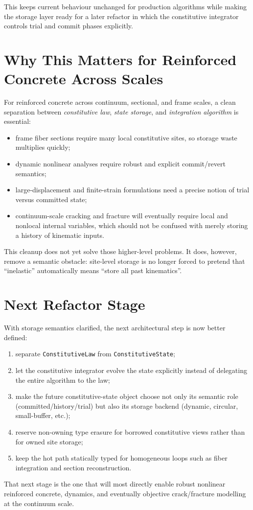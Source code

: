 This keeps current behaviour unchanged for production algorithms while making
the storage layer ready for a later refactor in which the constitutive integrator
controls trial and commit phases explicitly.

\section{Why This Matters for Reinforced Concrete Across Scales}

For reinforced concrete across continuum, sectional, and frame scales, a clean
separation between \emph{constitutive law}, \emph{state storage}, and
\emph{integration algorithm} is essential:

\begin{itemize}
  \item frame fiber sections require many local constitutive sites, so storage
        waste multiplies quickly;
  \item dynamic nonlinear analyses require robust and explicit commit/revert
        semantics;
  \item large-displacement and finite-strain formulations need a precise notion
        of trial versus committed state;
  \item continuum-scale cracking and fracture will eventually require local and
        nonlocal internal variables, which should not be confused with merely
        storing a history of kinematic inputs.
\end{itemize}

This cleanup does not yet solve those higher-level problems.  It does,
however, remove a semantic obstacle: site-level storage is no longer forced to
pretend that ``inelastic'' automatically means ``store all past kinematics''.

\section{Next Refactor Stage}

With storage semantics clarified, the next architectural step is now better
defined:

\begin{enumerate}
  \item separate \texttt{ConstitutiveLaw} from \texttt{ConstitutiveState};
  \item let the constitutive integrator evolve the state explicitly instead of
        delegating the entire algorithm to the law;
  \item make the future constitutive-state object choose not only its semantic
        role (committed/history/trial) but also its storage backend
        (dynamic, circular, small-buffer, etc.);
  \item reserve non-owning type erasure for borrowed constitutive views rather
        than for owned site storage;
  \item keep the hot path statically typed for homogeneous loops such as fiber
        integration and section reconstruction.
\end{enumerate}

That next stage is the one that will most directly enable robust nonlinear
reinforced concrete, dynamics, and eventually objective crack/fracture
modelling at the continuum scale.
